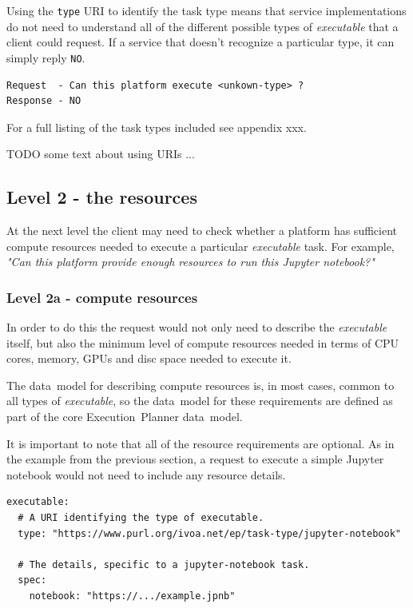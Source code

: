 \documentclass[11pt,a4paper]{ivoa}
\newcommand{\datamodel} {data~model}
\newcommand{\executionplanner} {Execution~Planner}
\newcommand{\jupyternotebook} {Jupyter notebook}
\newcommand{\codeword}[1] {\texttt{#1}}
\newcommand{\executable} {\textit{executable}}
\newcommand{\excutabletask} {\textit{executable} task}
\newcommand{\cpu} {CPU}
\newcommand{\gpu} {GPU}
\begin{document}
Using the \codeword{type} URI to identify the task type means that service implementations do not need to understand
all of the different possible types of \executable{} that a client could request.
If a service that doesn’t recognize a particular type, it can simply reply \codeword{NO}.

\begin{lstlisting}[]
Request  - Can this platform execute <unkown-type> ?
Response - NO
\end{lstlisting}

For a full listing of the task types included see appendix xxx.

TODO some text about using URIs ...

\subsection{Level 2 - the resources}
\label{resources}

At the next level the client may need to check whether a platform has sufficient compute resources
needed to execute a particular \excutabletask{}.
For example, \textit{"Can this platform provide enough resources to run this \jupyternotebook{}?"}

\subsubsection{Level 2a - compute resources}
\label{compute-resources}

In order to do this the request would not only need to describe the \executable{} itself,
but also the minimum level of compute resources needed in terms of \cpu{} cores, memory, \gpu{}s
and disc space needed to execute it.

The \datamodel{} for describing compute resources is, in most cases, common to all types of \executable{},
so the \datamodel{} for these requirements are defined as part of the core \executionplanner{} \datamodel{}.

It is important to note that all of the resource requirements are optional.
As in the example from the previous section, a request to execute a simple \jupyternotebook{}
would not need to include any resource details.

\begin{lstlisting}[]
executable:
  # A URI identifying the type of executable.
  type: "https://www.purl.org/ivoa.net/ep/task-type/jupyter-notebook"

  # The details, specific to a jupyter-notebook task.
  spec:
    notebook: "https://.../example.jpnb"
\end{lstlisting}
\end{document}
